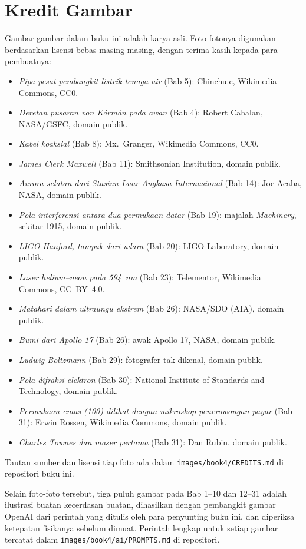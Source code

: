\chapter*{Kredit Gambar}

Gambar-gambar dalam buku ini adalah karya asli. Foto-fotonya digunakan
berdasarkan lisensi bebas masing-masing, dengan terima kasih kepada para
pembuatnya:

\begin{itemize}
  \item \emph{Pipa pesat pembangkit listrik tenaga air} (Bab 5):
        Chinchu.c, Wikimedia Commons, CC0.
  \item \emph{Deretan pusaran von Kármán pada awan} (Bab 4): Robert
        Cahalan, NASA/GSFC, domain publik.
  \item \emph{Kabel koaksial} (Bab 8): Mx.~Granger, Wikimedia
        Commons, CC0.
  \item \emph{James Clerk Maxwell} (Bab 11): Smithsonian Institution,
        domain publik.
  \item \emph{Aurora selatan dari Stasiun Luar Angkasa
        Internasional} (Bab 14): Joe Acaba, NASA, domain publik.
  \item \emph{Pola interferensi antara dua permukaan datar}
        (Bab 19): majalah \emph{Machinery}, sekitar 1915, domain
        publik.
  \item \emph{LIGO Hanford, tampak dari udara} (Bab 20): LIGO
        Laboratory, domain publik.
  \item \emph{Laser helium--neon pada 594~nm} (Bab 23): Telementor,
        Wikimedia Commons, CC~BY~4.0.
  \item \emph{Matahari dalam ultraungu ekstrem} (Bab 26): NASA/SDO
        (AIA), domain publik.
  \item \emph{Bumi dari Apollo 17} (Bab 26): awak Apollo 17, NASA,
        domain publik.
  \item \emph{Ludwig Boltzmann} (Bab 29): fotografer tak dikenal,
        domain publik.
  \item \emph{Pola difraksi elektron} (Bab 30): National Institute of
        Standards and Technology, domain publik.
  \item \emph{Permukaan emas (100) dilihat dengan mikroskop
        penerowongan payar} (Bab 31): Erwin Rossen, Wikimedia
        Commons, domain publik.
  \item \emph{Charles Townes dan maser pertama} (Bab 31): Dan Rubin,
        domain publik.
\end{itemize}

Tautan sumber dan lisensi tiap foto ada dalam
\texttt{images/book4/CREDITS.md} di repositori buku ini.

\bigskip
Selain foto-foto tersebut, tiga puluh gambar pada Bab 1--10 dan
12--31 adalah ilustrasi buatan kecerdasan buatan, dihasilkan dengan
pembangkit gambar OpenAI dari perintah yang ditulis oleh para
penyunting buku ini, dan diperiksa ketepatan fisikanya sebelum
dimuat. Perintah lengkap untuk setiap gambar tercatat dalam
\texttt{images/book4/ai/PROMPTS.md} di repositori.
\clearpage
